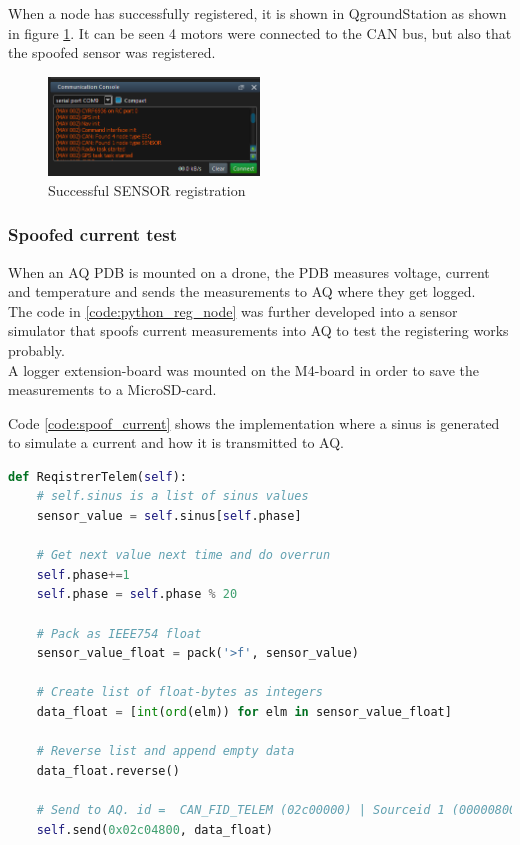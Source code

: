 When a node has successfully registered, it is shown in QgroundStation as shown in figure \ref{fig:successful_register}.
It can be seen 4 motors were connected to the CAN bus, but also that the spoofed sensor was registered.

\begin{figure}[H]
    \center
    \includegraphics[width=0.5\textwidth]{graphics/test_register_node.png}
    \caption{Successful SENSOR registration}
    \label{fig:successful_register}
\end{figure}

\subsubsection{Spoofed current test}
When an AQ PDB is mounted on a drone, the PDB measures voltage, current and temperature and sends the measurements to AQ where they get logged.\\
The code in \ref{code:python_reg_node} was further developed into a sensor simulator that spoofs current measurements into AQ to test the registering works probably. \\
A logger extension-board was mounted on the M4-board in order to save the measurements to a MicroSD-card.

Code \ref{code:spoof_current} shows the implementation where a sinus is generated to simulate a current and how it is transmitted to AQ. 

\begin{lstlisting}[language = python, caption = Snippet spoofing current measurements into AQ, label=code:spoof_current]
def ReqistrerTelem(self):
	# self.sinus is a list of sinus values
	sensor_value = self.sinus[self.phase]

	# Get next value next time and do overrun
	self.phase+=1
	self.phase = self.phase % 20

	# Pack as IEEE754 float
	sensor_value_float = pack('>f', sensor_value)

	# Create list of float-bytes as integers
	data_float = [int(ord(elm)) for elm in sensor_value_float]

	# Reverse list and append empty data
	data_float.reverse()
	
	# Send to AQ. id =  CAN_FID_TELEM (02c00000) | Sourceid 1 (00000800) | CAN_SENSORS_PDB_BATA (00004000)
	self.send(0x02c04800, data_float)
\end{lstlisting}

